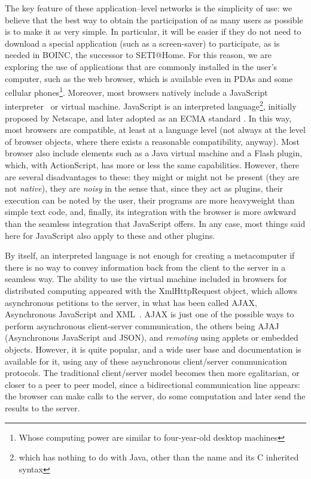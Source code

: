 \documentclass[runningheads,a4paper]{llncs}
\begin{document}
The key feature of these application--level networks is the simplicity
of use: we believe that the best way to obtain the participation of as
many users as possible is to make it as very simple. In particular, it
will be easier if they do not need to download a special application
(such as a screen-saver) to participate, as is needed in BOINC, the
successor to SETI@Home. For this reason, we are exploring the use of
applications that are commonly installed in the user's computer, such
as the web browser, which is available even in PDAs and some cellular
phones\footnote{Whose computing power are similar to four-year-old
desktop machines}.  Moreover, most browsers natively include a
JavaScript
interpreter~\cite{js:reference} or
virtual machine. JavaScript is an interpreted language\footnote{which
has nothing to do with Java, other than the name and its C inherited syntax},
initially proposed by Netscape, and later adopted as an
ECMA standard \cite{ECMA-262}.  In this
way, most browsers are compatible, at least at a language level (not
always at the level of browser objects, where there exists a
reasonable compatibility, anyway). Most browser also include elements
such as a Java virtual machine and a Flash plugin, which, with
ActionScript, has more or less the same capabilities. However, there
are several disadvantages to these: they might or might not be present
(they are not {\em native}), they are {\em noisy} in the sense that,
since they act as plugins, their execution can be noted by the
user, their programs are more heavyweight than simple text code, and,
finally, its integration with the browser is more awkward than the
seamless integration that JavaScript offers. In any case, most things
said here for JavaScript also apply to these and other plugins.

By itself, an interpreted language is not enough for creating a
metacomputer if there is no way to convey information back from the
client to the server in a seamless way. The ability to use the virtual
machine included in browsers for distributed computing appeared with
the {\sf XmlHttpRequest} object, which allows asynchronous petitions to the
server, in what has been called AJAX, Asynchronous JavaScript and
XML~\cite{wiki:AJAX}. AJAX is just one of the possible ways to
perform asynchronous client-server communication, the others being
AJAJ (Asynchronous JavaScript and JSON), and {\em remoting} using
applets or embedded objects. However, it is quite popular, and a wide
user base and documentation is available for it, using any of these
asynchronous client/server communication protocols. The traditional client/server model becomes then
more egalitarian, or closer to a peer to peer model, since a
bidirectional communication line appears: the browser can make calls to the
server, do some computation and later send the results to the server.
\end{document}
